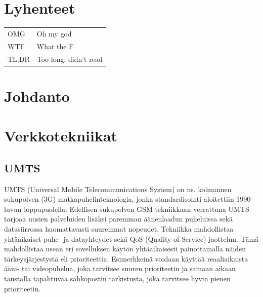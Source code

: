 \documentclass[11pt,a4paper,oneside,article,finnish]{memoir}
\begin{document}



\pagestyle{empty}
\setlength{\parskip}{1cm}
\chapter*{Lyhenteet}
\begin{table}[h]
\setlength{\tabcolsep}{8pt}
\renewcommand{\arraystretch}{2}
\begin{tabular}{l p{12cm}}
OMG & Oh my god\\
WTF & What the F\\
TL;DR & Too long, didn't read\\
\end{tabular}
\end{table}

\newpage

\pagestyle{plain}

\setcounter{page}{1} %




\chapter{Johdanto}
\chapter{Verkkotekniikat}
\section{UMTS}
UMTS (Universal Mobile Telecommunications System) on ns. kolmannen sukupolven (3G) matkapuhelinteknologia, jonka standardisointi aloitettiin 1990-luvun loppupuolella. Edellisen sukupolven GSM-tekniikkaan verrattuna UMTS tarjoaa uusien palveluiden lisäksi paremman äänenlaadun puheluissa sekä datasiirrossa huomattavasti suuremmat nopeudet. Tekniikka mahdollistaa yhtäaikaiset puhe- ja datayhteydet sekä QoS (Quality of Service) jaottelun. Tämä mahdollistaa usean eri sovelluksen käytön yhtäaikaisesti painottamalla näiden tärkeysjärjestystä eli prioriteettia. Esimerkkeinä voidaan käyttää reaaliaikaista ääni- tai videopuhelua, joka tarvitsee suuren prioriteetin ja samaan aikaan taustalla tapahtuvaa sähköpostin tarkistusta, joka tarvitsee hyvin pienen prioriteetin. 
\end{document}
